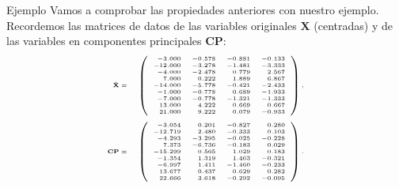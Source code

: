 \documentclass[
  spanish,
  ignorenonframetext,
]{beamer}
\begin{document}
\begin{frame}{Ejemplo}
\protect\hypertarget{ejemplo-10}{}
Vamos a comprobar las propiedades anteriores con nuestro ejemplo.
Recordemos las matrices de datos de las variables originales
\(\mathbf{X}\) (centradas) y de las variables en componentes principales
\(\mathbf{CP}\): \[
{\tiny 
\begin{array}{rl}
\tilde{\mathbf{X}} =  & 
\left(
\begin{array}{rrrr}
-3.000 & -0.578 & -0.881 & -0.133 \\
 -12.000 & -3.278 & -1.481 & -3.333 \\
 -4.000 & -2.478 & 0.779 & 2.567 \\
 7.000 & 0.222 & 1.889 & 6.867 \\
 -14.000 & -5.778 & -0.421 & -2.433 \\
 -1.000 & -0.778 & 0.689 & -1.933 \\
 -7.000 & -0.778 & -1.321 & -1.333 \\
 13.000 & 4.222 & 0.669 & 0.667 \\
 21.000 & 9.222 & 0.079 & -0.933 
\end{array}
\right) ,
\\ &  \\
\mathbf{CP}= &
\left(
\begin{array}{rrrr}
-3.054 & 0.201 & -0.827 & 0.280 \\
 -12.719 & 2.480 & -0.333 & 0.103 \\
 -4.293 & -3.295 & -0.025 & -0.228 \\
 7.373 & -6.736 & -0.183 & 0.029 \\
 -15.299 & 0.565 & 1.029 & 0.183 \\
 -1.354 & 1.319 & 1.463 & -0.321 \\
 -6.997 & 1.411 & -1.460 & -0.233 \\
 13.677 & 0.437 & 0.629 & 0.282 \\
 22.666 & 3.618 & -0.292 & -0.095 
\end{array}
\right).
\end{array}}
\]
\end{frame}
\end{document}
